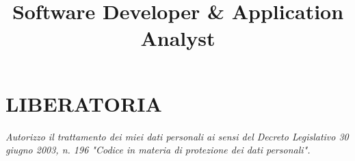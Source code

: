 \documentclass[10pt,a4paper,sans]{moderncv}
\title{Software Developer \& Application Analyst}
\begin{document}
\makecvtitle











\section{LIBERATORIA}
\textit{Autorizzo il trattamento dei miei dati personali ai sensi del Decreto
Legislativo 30 giugno 2003, n. 196 "Codice in materia di protezione dei dati personali".}
\end{document}
